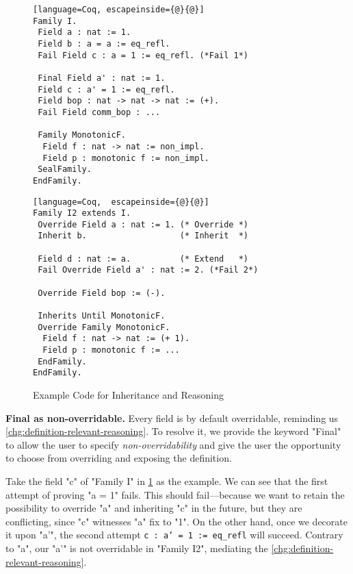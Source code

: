 \begin{figure}[!htb]
  \begin{minipage}[t]{0.45\linewidth}
\begin{lstlisting}[language=Coq, escapeinside={@}{@}]
Family I.
 Field a : nat := 1.
 Field b : a = a := eq_refl.
 Fail Field c : a = 1 := eq_refl. (*Fail 1*)

 Final Field a' : nat := 1.
 Field c : a' = 1 := eq_refl.
 Field bop : nat -> nat -> nat := (+).
 Fail Field comm_bop : ...

 Family MonotonicF.
  Field f : nat -> nat := non_impl.
  Field p : monotonic f := non_impl.
 SealFamily. 
EndFamily.
\end{lstlisting}
  \end{minipage}
\begin{minipage}[t]{0.45\linewidth}
\begin{lstlisting}[language=Coq,  escapeinside={@}{@}]
Family I2 extends I.
 Override Field a : nat := 1. (* Override *)
 Inherit b.                   (* Inherit  *)

 Field d : nat := a.          (* Extend   *)
 Fail Override Field a' : nat := 2. (*Fail 2*)

 Override Field bop := (-).

 Inherits Until MonotonicF.
 Override Family MonotonicF.
  Field f : nat -> nat := (+ 1).
  Field p : monotonic f := ...
 EndFamily. 
EndFamily.
\end{lstlisting}
  \end{minipage}
  \caption{Example Code for Inheritance and Reasoning}\label{fig:plugin-example3}
\end{figure}


\textbf{Final as non-overridable.} Every field is by default overridable, reminding us \ref{chg:definition-relevant-reasoning}.  To resolve it, we provide the keyword "Final" to allow the user to specify \textit{non-overridability} and give the user the opportunity to choose from overriding and exposing the definition.

Take the field "c" of "Family I" in \cref{fig:plugin-example3} as the
example. We can see that the first attempt of proving "a = 1" fails.
This should fail---because we want to retain the possibility
to override "a" and inheriting "c" in the future, but they are conflicting, since "c" witnesses "a" fix to "1". On the other hand, once we decorate it upon "a'", the second attempt \texttt{c : a' = 1 := eq_refl} will succeed. Contrary to "a", our "a'" is not overridable in "Family I2", mediating the \ref{chg:definition-relevant-reasoning}.

